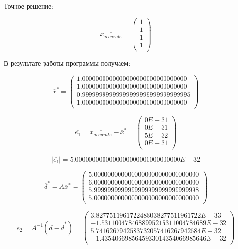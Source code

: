 \documentclass [12pt]{article}
\begin{document}
Точное решение:

$$\overline{x_{accurate}} = \left(\begin{array}{c}
1 \\
1 \\
1 \\
1 \\
\end{array}\right)
$$

В результате работы программы получаем:

$$\overline{x}^{*} = \left(\begin{array}{c}
1.0000000000000000000000000000000 \\
1.0000000000000000000000000000000 \\
0.99999999999999999999999999999995 \\
1.0000000000000000000000000000000 \\
\end{array}\right)
$$

$$\overline{e_1} = \overline{x_{accurate}} - \overline{x}^{*} = \left(\begin{array}{c}
0E-31 \\
0E-31 \\
5E-32 \\
0E-31 \\
\end{array}\right)
$$

$$|\overline{e_1}| = 5.0000000000000000000000000000000E-32$$

$$\overline{d}^{*} = A\overline{x}^{*} = \left(\begin{array}{c}
5.0000000000000000000000000000000 \\
6.0000000000000000000000000000000 \\
5.9999999999999999999999999999998 \\
5.0000000000000000000000000000000 \\
\end{array}\right)
$$

$$\overline{e_2} = A^{-1}(\overline{d} - \overline{d}^{*}) = \left(\begin{array}{c}
3.8277511961722488038277511961722E-33 \\
-1.5311004784688995215311004784689E-32 \\
5.7416267942583732057416267942584E-32 \\
-1.4354066985645933014354066985646E-32 \\
\end{array}\right)
$$
\end{document}
